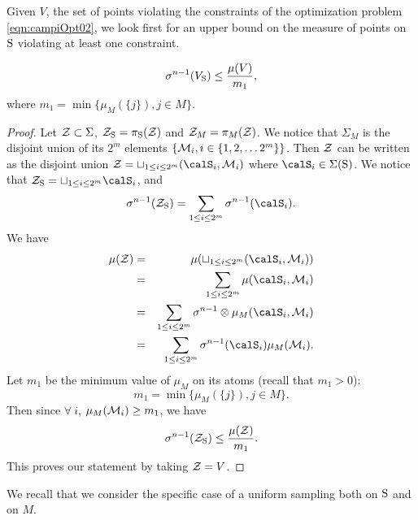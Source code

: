 
Given $V$, the set of points violating the constraints of the optimization problem \eqref{eqn:campiOpt02}, we look first for an upper bound on the measure of points on $\text{S}$ violating at least one constraint.

\begin{lemma}$$\sigma^{n-1}(V_{\text{S}}) \leq \frac{\mu(V)}{m_1},$$ where $m_1 = \min \{\mu_M(\{j\}), j \in M\}$.\end{lemma}
\begin{proof}

Let $\mathcal{Z} \subset \Sigma$, $\mathcal{Z}_{\text{S}} = \pi_{\text{S}} (\mathcal{Z})$ and $\mathcal{Z}_M = \pi_M (\mathcal{Z})$. We notice that $\Sigma_M$ is the disjoint union of its $2^m$ elements $\{\mathcal{M}_i, i \in \{1,2, \ldots 2^m\} \}$. Then $\mathcal{Z}$ can be written as the disjoint union $\calZ = \sqcup_{1 \leq i \leq 2^m} (\calS_i, \calM_i)$ where $\calS_i \in \Sigma(\sphere)$. We notice that 
$\calZ_{\sphere} = \sqcup_{1 \leq i \leq 2^m} \calS_i$, 
and
\begin{equation*}
\sigma^{n-1} (\calZ_{\sphere}) = \sum_{1 \leq i \leq 2^m} \sigma^{n-1} (\calS_i).
\end{equation*}
We have 
\begin{eqnarray*}
\mu(\calZ) &=& \mu(\sqcup_{1 \leq i \leq 2^m} (\calS_i, \calM_i)) \\
&=& \sum_{1 \leq i \leq 2^m} \mu(\calS_i, \calM_i) \\
 &=& \sum_{1 \leq i \leq 2^m} \sigma^{n-1} \otimes \mu_M (\calS_i, \calM_i) \\
 & = &\sum_{1 \leq i \leq 2^m} \sigma^{n-1}(\calS_i) \mu_M (\calM_i).
\end{eqnarray*}
Let $m_1$ be the minimum value  of $\mu_M$ on its atoms (recall that $m_1 > 0$):
$$m_1 = \min \{\mu_M(\{j\}), j \in M\}.$$ Then since $ \forall \ i$, $\mu_M(\mathcal{M}_i) \geq m_1$, we have
\begin{equation}
\sigma^{n-1}(\mathcal{Z}_{\text{S}}) \leq \frac{\mu(\mathcal{Z})}{m_1}.
\end{equation}
This proves our statement by taking $\mathcal{Z} = V$.
\end{proof}

We recall that we consider the specific case of a uniform sampling both on $\text{S}$ and on $M$. 

